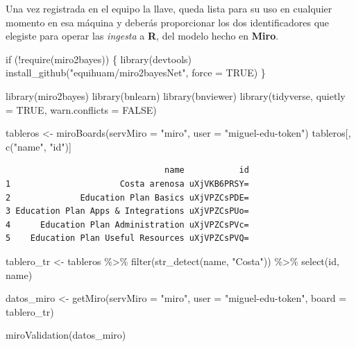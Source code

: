 \documentclass[
  letterpaper,
  DIV=11,
  numbers=noendperiod]{scrreprt}
\newenvironment{Shaded}{\begin{snugshade}}{\end{snugshade}}
\newcommand{\AttributeTok}[1]{\textcolor[rgb]{0.40,0.45,0.13}{#1}}
\newcommand{\ConstantTok}[1]{\textcolor[rgb]{0.56,0.35,0.01}{#1}}
\newcommand{\ControlFlowTok}[1]{\textcolor[rgb]{0.00,0.23,0.31}{#1}}
\newcommand{\FunctionTok}[1]{\textcolor[rgb]{0.28,0.35,0.67}{#1}}
\newcommand{\NormalTok}[1]{\textcolor[rgb]{0.00,0.23,0.31}{#1}}
\newcommand{\OtherTok}[1]{\textcolor[rgb]{0.00,0.23,0.31}{#1}}
\newcommand{\SpecialCharTok}[1]{\textcolor[rgb]{0.37,0.37,0.37}{#1}}
\newcommand{\StringTok}[1]{\textcolor[rgb]{0.13,0.47,0.30}{#1}}
\begin{document}
Una vez registrada en el equipo la llave, queda lista para su uso en
cualquier momento en esa máquina y deberás proporcionar los dos
identificadores que elegiste para operar las \emph{ingesta} a
\textbf{R}, del modelo hecho en \textbf{Miro}.

\begin{Shaded}
\begin{Highlighting}[]
\ControlFlowTok{if}\NormalTok{ (}\SpecialCharTok{!}\FunctionTok{require}\NormalTok{(miro2bayes))}
\NormalTok{\{}
  \FunctionTok{library}\NormalTok{(devtools)}
  \FunctionTok{install\_github}\NormalTok{(}\StringTok{"equihuam/miro2bayesNet"}\NormalTok{, }\AttributeTok{force =} \ConstantTok{TRUE}\NormalTok{)}
\NormalTok{\}}

\FunctionTok{library}\NormalTok{(miro2bayes)}
\FunctionTok{library}\NormalTok{(bnlearn)}
\FunctionTok{library}\NormalTok{(bnviewer)}
\FunctionTok{library}\NormalTok{(tidyverse, }\AttributeTok{quietly =} \ConstantTok{TRUE}\NormalTok{, }\AttributeTok{warn.conflicts =} \ConstantTok{FALSE}\NormalTok{)}

\NormalTok{tableros }\OtherTok{\textless{}{-}} \FunctionTok{miroBoards}\NormalTok{(}\AttributeTok{servMiro =} \StringTok{"miro"}\NormalTok{, }\AttributeTok{user =} \StringTok{"miguel{-}edu{-}token"}\NormalTok{)}
\NormalTok{tableros[, }\FunctionTok{c}\NormalTok{(}\StringTok{"name"}\NormalTok{, }\StringTok{"id"}\NormalTok{)]}
\end{Highlighting}
\end{Shaded}

\begin{verbatim}
                                name           id
1                      Costa arenosa uXjVKB6PRSY=
2              Education Plan Basics uXjVPZCsPDE=
3 Education Plan Apps & Integrations uXjVPZCsPUo=
4      Education Plan Administration uXjVPZCsPVc=
5    Education Plan Useful Resources uXjVPZCsPVQ=
\end{verbatim}

\begin{Shaded}
\begin{Highlighting}[]
\NormalTok{tablero\_tr }\OtherTok{\textless{}{-}}\NormalTok{ tableros }\SpecialCharTok{\%\textgreater{}\%}
              \FunctionTok{filter}\NormalTok{(}\FunctionTok{str\_detect}\NormalTok{(name, }\StringTok{"Costa"}\NormalTok{)) }\SpecialCharTok{\%\textgreater{}\%}
              \FunctionTok{select}\NormalTok{(id, name)}

\NormalTok{datos\_miro }\OtherTok{\textless{}{-}} \FunctionTok{getMiro}\NormalTok{(}\AttributeTok{servMiro =} \StringTok{"miro"}\NormalTok{, }\AttributeTok{user =} \StringTok{"miguel{-}edu{-}token"}\NormalTok{,}
                        \AttributeTok{board =}\NormalTok{ tablero\_tr)}

\FunctionTok{miroValidation}\NormalTok{(datos\_miro)}
\end{Highlighting}
\end{Shaded}
\end{document}

